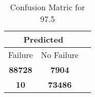 \begin{table}[] 
\caption{Confusion Matric for 97.5} 
\label{Table: Prediction Accuracy-DMD97.5OnlySunEKF-combinationReflectionEKF-top2-Reflection} 
\centering 
\begin{tabular} 
 {@{}ccc@{}} 
\toprule 
\multicolumn{2}{c}{\textbf{Predicted}}
 \\ \midrule 
\multicolumn{1}{|c|}{Failure} & 
\multicolumn{1}{c|}{No Failure}
 \\ \midrule 
\multicolumn{1}{|c|}{\color{green}\textbf{88728}} & 
\multicolumn{1}{c|}{\color{red}\textbf{7904}}
 \\ \midrule 
\multicolumn{1}{|c|}{\color{red}\textbf{10}} & 
\multicolumn{1}{c|}{\color{green}\textbf{73486}}
 \\ \bottomrule 
\end{tabular} 
\end{table} 

